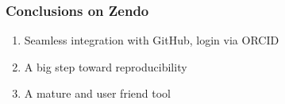 
\begin{frame}[c]
\frametitle{Conclusions on Zendo}

\begin{enumerate}
\item Seamless integration with GitHub, login via ORCID
\item A big step toward reproducibility
\item A mature and user friend tool 
\end{enumerate}

\end{frame}

